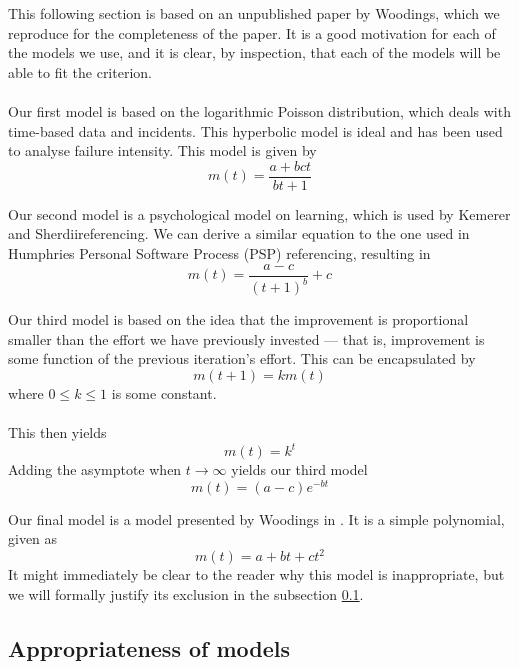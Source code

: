 This following section is based on an unpublished paper by Woodings, which we
reproduce for the completeness of the paper.
It is a good motivation for each of the models we use, and it is clear, by
inspection, that each of the models will be able to fit the criterion.\\
\\
Our first model is based on the logarithmic Poisson distribution, which
deals with time-based data and incidents.
This hyperbolic model is ideal and has been used to analyse failure intensity.
This model is given by
\begin{equation} \label{modelOne}
  m(t) = \frac{a+bct}{bt+1}
\end{equation}

Our second model is a psychological model on learning, which is used by Kemerer
and Sherdii\FIXME referencing.
We can derive a similar equation to the one used in Humphries Personal Software
Process (PSP) \FIXME referencing, resulting in
\begin{equation} \label{modelTwo}
  m(t) = \frac{a-c}{(t+1)^{b}}+c
\end{equation}

Our third model is based on the idea that the improvement is proportional
smaller than
the effort we have previously invested --- that is, improvement is some function of the
previous iteration's effort.
This can be encapsulated by 
\[
  m(t+1) = k m(t)
\]
where $0 \leq k \leq 1$ is some constant.\\
\\
This then yields
\[
  m(t) = k^t 
\]
Adding the asymptote when $t \to \infty$ yields our third model
\begin{equation} \label{modelThree}
  m(t) = (a-c) e^{-bt}
\end{equation}

Our final model is a model presented by Woodings in \FIXME.
It is a simple polynomial, given as
\begin{equation} \label{modelFour}
  m(t) = a + bt + ct^2
\end{equation}
It might immediately be clear to the reader why this model is inappropriate, but
we will formally justify its exclusion in the subsection \ref{subsecAppropriateness}.

\subsection{Appropriateness of models} \label{subsecAppropriateness}
